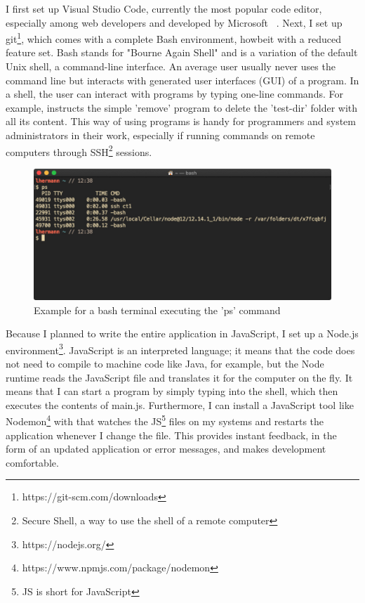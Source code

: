 I first set up Visual Studio Code, currently the most popular code editor, especially among web developers and developed by Microsoft ~\cite{stackoverflow.2019}. Next, I set up git\footnote{https://git-scm.com/downloads}, which comes with a complete Bash environment, howbeit with a reduced feature set. Bash stands for "Bourne Again Shell" and is a variation of the default Unix shell, a command-line interface. An average user usually never uses the command line but interacts with generated user interfaces (GUI) of a program. In a shell, the user can interact with programs by typing one-line commands. For example,  instructs the simple 'remove' program to delete the 'test-dir' folder with all its content. This way of using programs is handy for programmers and system administrators in their work, especially if running commands on remote computers through SSH\footnote{Secure Shell, a way to use the shell of a remote computer} sessions.

\begin{figure}[ht]
  \centering
  \includegraphics[width=0.75\linewidth]{assets/example-bash-window.jpg}
  \caption{Example for a bash terminal executing the 'ps' command}
\end{figure}

Because I planned to write the entire application in JavaScript, I set up a Node.js environment\footnote{https://nodejs.org/}. JavaScript is an interpreted language; it means that the code does not need to compile to machine code like Java, for example, but the Node runtime reads the JavaScript file and translates it for the computer on the fly. It means that I can start a program by simply typing  into the shell, which then executes the contents of main.js. Furthermore, I can install a JavaScript tool like Nodemon\footnote{https://www.npmjs.com/package/nodemon} with  that watches the JS\footnote{JS is short for JavaScript} files on my systems and restarts the application whenever I change the file. This provides instant feedback, in the form of an updated application or error messages, and makes development comfortable.

